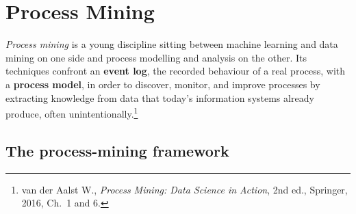 \section{Process Mining}

\emph{Process mining} is a young discipline sitting between machine learning and data mining on one side and process modelling and analysis on the other. Its techniques confront an \textbf{event log}, the recorded behaviour of a real process, with a \textbf{process model}, in order to discover, monitor, and improve processes by extracting knowledge from data that today's information systems already produce, often unintentionally.\footnote{van der Aalst W., \emph{Process Mining: Data Science in Action}, 2nd ed., Springer, 2016, Ch.~1 and 6.}

\subsection{The process-mining framework}

